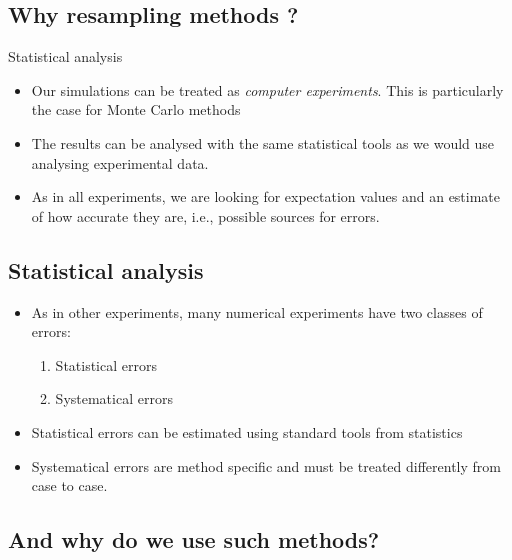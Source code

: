 \documentclass[%
oneside,                 %
final,                   %
10pt]{article}
\begin{document}
\subsection{Why resampling methods ?}
\begin{block}{Statistical analysis }
\begin{itemize}
\item Our simulations can be treated as \emph{computer experiments}. This is particularly the case for Monte Carlo methods

\item The results can be analysed with the same statistical tools as we would use analysing experimental data.

\item As in all experiments, we are looking for expectation values and an estimate of how accurate they are, i.e., possible sources for errors.
\end{itemize}

\noindent
\end{block}    

\subsection{Statistical analysis}
\begin{block}{}
\begin{itemize}
\item As in other experiments, many numerical  experiments have two classes of errors:
\begin{enumerate}

\item Statistical errors

\item Systematical errors

\end{enumerate}

\noindent
\item Statistical errors can be estimated using standard tools from statistics

\item Systematical errors are method specific and must be treated differently from case to case. 
\end{itemize}

\noindent
\end{block}    

\subsection{And why do we use such methods?}
\end{document}

